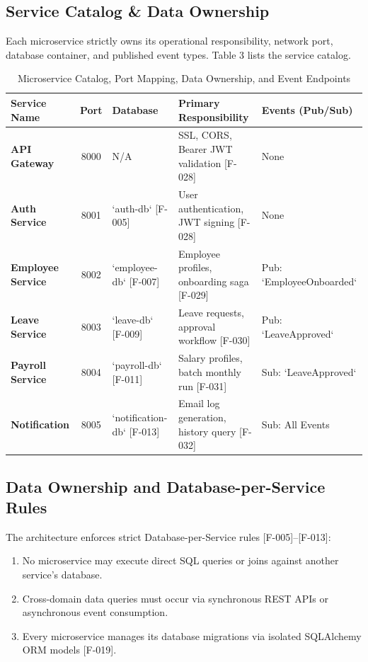 \documentclass[11pt,a4paper]{article}
\begin{document}
\subsection{Service Catalog \& Data Ownership}
Each microservice strictly owns its operational responsibility, network port, database container, and published event types. Table 3 lists the service catalog.

\begin{table}[htbp]
\caption{Microservice Catalog, Port Mapping, Data Ownership, and Event Endpoints}
\centering
\begin{tabularx}{\linewidth}{l c l X X}
\toprule
\textbf{Service Name} & \textbf{Port} & \textbf{Database} & \textbf{Primary Responsibility} & \textbf{Events (Pub/Sub)} \\
\midrule
\textbf{API Gateway} & 8000 & N/A & SSL, CORS, Bearer JWT validation [F-028] & None \\
\textbf{Auth Service} & 8001 & `auth-db` [F-005] & User authentication, JWT signing [F-028] & None \\
\textbf{Employee Service} & 8002 & `employee-db` [F-007] & Employee profiles, onboarding saga [F-029] & Pub: `EmployeeOnboarded` \\
\textbf{Leave Service} & 8003 & `leave-db` [F-009] & Leave requests, approval workflow [F-030] & Pub: `LeaveApproved` \\
\textbf{Payroll Service} & 8004 & `payroll-db` [F-011] & Salary profiles, batch monthly run [F-031] & Sub: `LeaveApproved` \\
\textbf{Notification} & 8005 & `notification-db` [F-013] & Email log generation, history query [F-032] & Sub: All Events \\
\bottomrule
\end{tabularx}
\end{table}

\subsection{Data Ownership and Database-per-Service Rules}
The architecture enforces strict Database-per-Service rules [F-005]--[F-013]:
\begin{enumerate}
    \item No microservice may execute direct SQL queries or joins against another service's database.
    \item Cross-domain data queries must occur via synchronous REST APIs or asynchronous event consumption.
    \item Every microservice manages its database migrations via isolated SQLAlchemy ORM models [F-019].
\end{enumerate}
\end{document}
